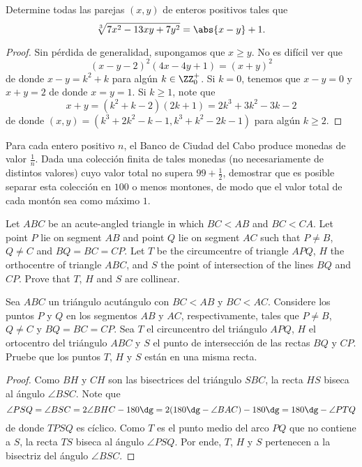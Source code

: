 \begin{probEG}
	Determine todas las parejas $(x,y)$ de enteros positivos tales que
	\[\sqrt[3]{7x^2-13xy+7y^2}=\abs{x-y}+1.\]
\end{probEG}

\begin{proof}
	Sin pérdida de generalidad, supongamos que $x\ge y$. No es difícil ver que
	\[(x-y-2)^2(4x-4y+1)=(x+y)^2\]
	de donde $x-y=k^2+k$ para algún $k\in\ZZ^+_0$. Si $k=0$, tenemos que $x-y=0$ y $x+y=2$ de donde $x=y=1$. Si $k\ge 1$, note que
	\[x+y=(k^2+k-2)(2k+1)=2k^3+3k^2-3k-2\]
	de donde $(x,y)=(k^3+2k^2-k-1,k^3+k^2-2k-1)$ para algún $k\ge 2$.
\end{proof}

\begin{problem}
	Para cada entero positivo $n$, el Banco de Ciudad del Cabo produce monedas de valor $\frac1n$. Dada una colección finita de tales monedas (no necesariamente de distintos valores) cuyo valor total no supera $99+\frac12$, demostrar que es posible separar esta colección en $100$ o menos montones, de modo que el valor total de cada montón sea como máximo $1$.
\end{problem}

\begin{probEG}[EGMO 2022/1]
	Let $ABC$ be an acute-angled triangle in which $BC<AB$ and $BC<CA$. Let point $P$ lie on segment $AB$ and point $Q$ lie on segment $AC$ such that $P\ne B$, $Q\ne C$ and $BQ=BC=CP$. Let $T$ be the circumcentre of triangle $APQ$, $H$ the orthocentre of triangle $ABC$, and $S$ the point of intersection of the lines $BQ$ and $CP$. Prove that $T$, $H$ and $S$ are collinear.
	\begin{probSP}
		Sea $ABC$ un triángulo acutángulo con $BC<AB$ y $BC<AC$. Considere los puntos $P$ y $Q$ en los segmentos $AB$ y $AC$, respectivamente, tales que $P\ne B$, $Q\ne C$ y $BQ=BC=CP$. Sea $T$ el circuncentro del triángulo $APQ$, $H$ el ortocentro del triángulo $ABC$ y $S$ el punto de intersección de las rectas $BQ$ y $CP$. Pruebe que los puntos $T$, $H$ y $S$ están en una misma recta.
	\end{probSP}
\end{probEG}

\begin{proof}
	Como $BH$ y $CH$ son las bisectrices del triángulo $SBC$, la recta $HS$ biseca al ángulo $\angle BSC$. Note que
	\[\angle PSQ=\angle BSC=2\angle BHC-180\dg=2(180\dg-\angle BAC)-180\dg=180\dg-\angle PTQ\]
	de donde $TPSQ$ es cíclico. Como $T$ es el punto medio del arco $PQ$ que no contiene a $S$, la recta $TS$ biseca al ángulo $\angle PSQ$. Por ende, $T$, $H$ y $S$ pertenecen a la bisectriz del ángulo $\angle BSC$.
\end{proof}

